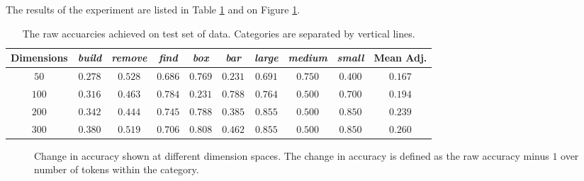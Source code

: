 \documentclass[a4paper]{article}
\newcommand{\tabledata}{graph_adjusted.dat}
\begin{document}
The results of the experiment are listed in Table \ref{table-results} and
on Figure \ref{graph-accuracy}.

\begin{table}[h]
 \caption{The raw accuarcies achieved on test set of data. Categories are separated by vertical lines.}
 \label{table-results}
 \begin{center}
  \begin{tabular}{c||ccc|cc|ccc||c}
    \hline \hline
    Dimensions & \textit{build} & \textit{remove} & \textit{find} &
    \textit{box} & \textit{bar} & \textit{large} & \textit{medium} &
    \textit{small} & Mean Adj. \\
    \hline
     $50$ & $0.278$ & $0.528$ & $0.686$ & $0.769$ & $0.231$ & $0.691$ & $0.750$ & $0.400$  & $0.167$ \\
     $100$ & $0.316$ & $0.463$ & $0.784$ & $0.231$ & $0.788$ & $0.764$ & $0.500$ & $0.700$ & $0.194$ \\
     $200$ & $0.342$ & $0.444$ & $0.745$ & $0.788$ & $0.385$ & $0.855$ & $0.500$ & $0.850$ & $0.239$ \\
     $300$ & $0.380$ & $0.519$ & $0.706$ & $0.808$ & $0.462$ & $0.855$ & $0.500$ & $0.850$ & $0.260$ \\
    \hline
  \end{tabular}
 \end{center}
\end{table}

\begin{figure}[h]
\centering
{} 
\caption{Change in accuracy shown at different dimension spaces.
The change in accuracy is defined as the raw accuracy minus $1$ over
number of tokens within the category.}
\label{graph-accuracy}
\end{figure}
\end{document}
